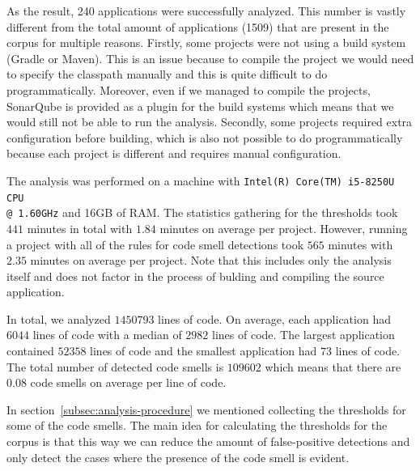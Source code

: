 

As the result, 240 applications were successfully analyzed.
This number is vastly different from the total amount of applications (1509) that are present in the corpus for multiple reasons.
Firstly, some projects were not using a build system (Gradle or Maven).
This is an issue because to compile the project we would need to specify the classpath manually and
this is quite difficult to do programmatically.
Moreover, even if we managed to compile the projects, SonarQube is provided as a plugin for the build systems which means
that we would still not be able to run the analysis.
Secondly, some projects required extra configuration before building, which is also not possible to do
programmatically because each project is different and requires manual configuration.

The analysis was performed on a machine with \verb|Intel(R) Core(TM) i5-8250U CPU| \\ \verb|@ 1.60GHz| and 16GB of RAM\@.
The statistics gathering for the thresholds took $441$ minutes in total with $1.84$ minutes on average per project.
However, running a project with all of the rules for code smell detections took $565$ minutes with $2.35$ minutes on average per project.
Note that this includes only the analysis itself and does not factor in the process of bulding and compiling the source
application.

In total, we analyzed $1450793$ lines of code.
On average, each application had $6044$ lines of code with a median of $2982$ lines of code.
The largest application contained $52358$ lines of code and the smallest application had $73$ lines of code.
The total number of detected code smells is $109602$ which means that there are $0.08$ code smells on average per line of code.


In section~\ref{subsec:analysis-procedure} we mentioned collecting the thresholds for some of the code smells.
The main idea for calculating the thresholds for the corpus is that this way we can reduce
the amount of false-positive detections and only detect the cases where the presence of the code smell is evident.

